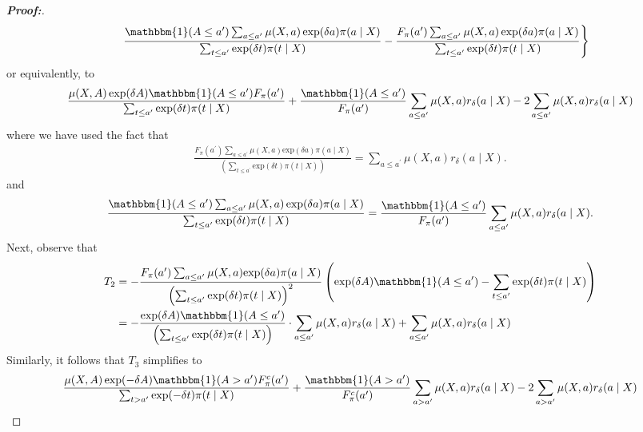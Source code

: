 \documentclass[11pt,twoside]{article}
\theoremstyle{definition}
\theoremstyle{remark}
\begin{document}
\begin{proof}[\textbf{Proof:}]
\begin{align*}
    &\phantom{{}={\Bigg\{}}\frac{ \mathbbm{1}(A \leq a^{\prime})\sum_{a \leq a^{\prime}} \mu(X, a) \exp(\delta a) \pi(a \mid X)}{\sum_{t \leq a^{\prime}} \text{exp}(\delta t) \pi(t \mid X)} - \frac{F_{\pi}(a^{\prime}) \sum_{a \leq a^{\prime}} \mu(X, a) \exp(\delta a) \pi(a \mid X)   }{\sum_{t \leq a^{\prime}} \text{exp}(\delta t) \pi(t \mid X)} \Bigg\}
\end{align*}
or equivalently, to
\begin{align*}
    \frac{\mu(X, A) \exp(\delta A) \mathbbm{1}(A \leq a^{\prime})  F_{\pi}(a^{\prime})}{\sum_{t \leq a^{\prime}} \text{exp}(\delta t) \pi(t \mid X)} + \frac{\mathbbm{1}(A \leq a^{\prime})}{F_{\pi}(a^{\prime})} \sum_{a \leq a^{\prime}} \mu(X, a) r_\delta(a \mid X) - 2\sum_{a \leq a^{\prime}} \mu(X, a) r_\delta(a \mid X)
\end{align*}
where we have used the fact that
\begin{align*}
    \frac{F_\pi(a^{\prime}) \sum_{a \leq a^{\prime}}\mu(X, a) \text{exp}(\delta a) \pi(a \mid X)}{\left(\sum_{t \leq a^{\prime}} \text{exp}(\delta t) \pi(t \mid X) \right)} = \sum_{a \leq a^{\prime}} \mu(X, a) r_\delta(a \mid X).
\end{align*}
and
\begin{align*}
    \frac{\mathbbm{1}(A \leq a^{\prime})\sum_{a \leq a^{\prime}} \mu(X, a) \exp(\delta a) \pi(a \mid X) }{\sum_{t \leq a^{\prime}} \text{exp}(\delta t) \pi(t \mid X)} = \frac{\mathbbm{1}(A \leq a^{\prime})}{F_{\pi}(a^{\prime})} \sum_{a \leq a^{\prime}} \mu(X, a) r_\delta(a \mid X).
\end{align*}
Next, observe that
\begin{align*}
   T_2 &= -  \frac{F_\pi(a^{\prime}) \sum_{a \leq a^{\prime}}\mu(X, a) \text{exp}(\delta a) \pi(a \mid X) }{\left(\sum_{t \leq a^{\prime}} \text{exp}(\delta t) \pi(t \mid X) \right)^2}\left( \text{exp}(\delta A) \mathbbm{1}(A \leq a^{\prime}) - \sum_{t \leq a^{\prime}} \text{exp}(\delta t) \pi(t \mid X)  \right) \\
   &= -\frac{ \text{exp}(\delta A) \mathbbm{1}(A \leq a^{\prime}) }{\left(\sum_{t \leq a^{\prime}} \text{exp}(\delta t) \pi(t \mid X) \right)} \cdot  \sum_{a \leq a^{\prime}} \mu(X, a) r_\delta(a \mid X)  +  \sum_{a \leq a^{\prime}} \mu(X, a) r_\delta(a \mid X)
\end{align*}
Similarly, it follows that $T_3$ simplifies to
\begin{align*}
    \frac{\mu(X, A) \exp(- \delta A) \mathbbm{1}(A > a^{\prime})  F^c_{\pi}(a^{\prime})}{\sum_{t > a^{\prime}} \text{exp}(- \delta t) \pi(t \mid X)} + \frac{\mathbbm{1}(A > a^{\prime})}{F^c_{\pi}(a^{\prime})} \sum_{a > a^{\prime}} \mu(X, a) r_\delta(a \mid X) - 2\sum_{a > a^{\prime}} \mu(X, a) r_\delta(a \mid X)

\end{align*}
\end{proof}
\end{document}
